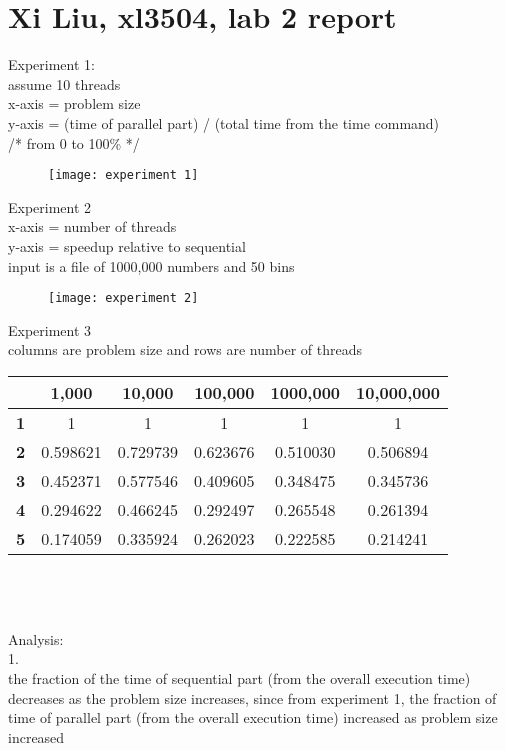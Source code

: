 \documentclass[12pt,border=4pt,multi]{article} %
\begin{document}
\section*{Xi Liu, xl3504, lab 2 report}
Experiment 1:\\
assume 10 threads\\
x-axis = problem size\\
y-axis = (time of parallel part) / (total time from 
the time command)\\
/* from 0 to 100\% */\\
\begin{figure}[h!]
	\centering
	\texttt{[image: experiment 1]} %
\end{figure}
\newpage
\noindent
Experiment 2\\
x-axis = number of threads\\
y-axis = speedup relative to sequential\\
input is a file of 1000,000 numbers and 50 bins\\
\begin{figure}[h!]
	\centering
	\texttt{[image: experiment 2]} %
\end{figure}
\newpage
\noindent
Experiment 3\\
columns are problem size and rows are number of threads
{\Large
\begin{center}
\begin{tabular}{|c|c|c|c|c|c|} \hline
 & \textbf{1,000} & \textbf{10,000} & \textbf{100,000} & \textbf{1000,000} & \textbf{10,000,000}\\ \hline
\textbf{1} & 1 & 1 & 1 & 1 & 1\\ \hline
\textbf{2} & 0.598621 & 0.729739 & 0.623676 & 0.510030 & 0.506894\\ \hline
\textbf{3} & 0.452371 & 0.577546 & 0.409605 & 0.348475 & 0.345736\\ \hline
\textbf{4} & 0.294622 & 0.466245 & 0.292497 & 0.265548 & 0.261394\\ \hline
\textbf{5} & 0.174059 & 0.335924 & 0.262023 & 0.222585 & 0.214241\\ \hline
\end{tabular}
\end{center}
}
\leavevmode
\\
\\
\\
Analysis:\\
1.\\
the fraction of the time of sequential part (from the overall execution time) decreases as the problem size increases, since from experiment 1, the fraction of time of parallel part (from the overall execution time) increased as problem size increased\\
\end{document}
